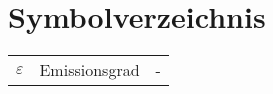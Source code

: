 \chapter*{Symbolverzeichnis}

\begin{center}
	
	\renewcommand{\arraystretch}{1.1}
	
	\begin{supertabular}{p{1.85cm}p{9cm}p{1.85cm}} %
		$\varepsilon$ 	& Emissionsgrad 	& - \\
	\end{supertabular}

\end{center}